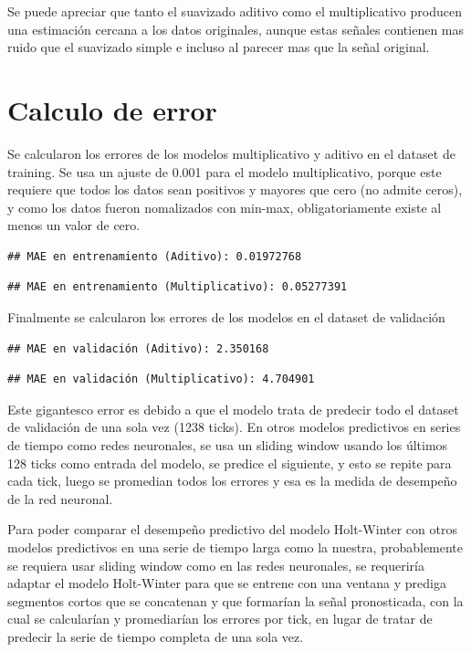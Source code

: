 \documentclass[
]{book}
\begin{document}
Se puede apreciar que tanto el suavizado aditivo como el multiplicativo producen una estimación cercana a los datos originales, aunque estas señales contienen mas ruido que el suavizado simple e incluso al parecer mas que la señal original.

\section{Calculo de error}\label{calculo-de-error}

Se calcularon los errores de los modelos multiplicativo y aditivo en el dataset de training. Se usa un ajuste de 0.001 para el modelo multiplicativo, porque este requiere que todos los datos sean positivos y mayores que cero (no admite ceros), y como los datos fueron nomalizados con min-max, obligatoriamente existe al menos un valor de cero.

\begin{verbatim}
## MAE en entrenamiento (Aditivo): 0.01972768
\end{verbatim}

\begin{verbatim}
## MAE en entrenamiento (Multiplicativo): 0.05277391
\end{verbatim}

Finalmente se calcularon los errores de los modelos en el dataset de validación

\begin{verbatim}
## MAE en validación (Aditivo): 2.350168
\end{verbatim}

\begin{verbatim}
## MAE en validación (Multiplicativo): 4.704901
\end{verbatim}

Este gigantesco error es debido a que el modelo trata de predecir todo el dataset de validación de una sola vez (1238 ticks). En otros modelos predictivos en series de tiempo como redes neuronales, se usa un sliding window usando los últimos 128 ticks como entrada del modelo, se predice el siguiente, y esto se repite para cada tick, luego se promedian todos los errores y esa es la medida de desempeño de la red neuronal.

Para poder comparar el desempeño predictivo del modelo Holt-Winter con otros modelos predictivos en una serie de tiempo larga como la nuestra, probablemente se requiera usar sliding window como en las redes neuronales, se requeriría adaptar el modelo Holt-Winter para que se entrene con una ventana y prediga segmentos cortos que se concatenan y que formarían la señal pronosticada, con la cual se calcularían y promediarían los errores por tick, en lugar de tratar de predecir la serie de tiempo completa de una sola vez.
\end{document}
